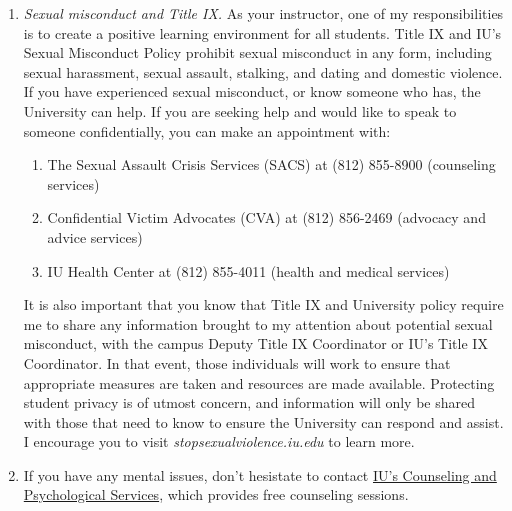 \documentclass[11pt,article,oneside]{memoir} %
\begin{document}
\begin{enumerate}
\item \emph{Sexual misconduct and Title IX.} As your instructor, one of my
responsibilities is to create a positive learning environment for all students.
Title IX and IU's Sexual Misconduct Policy prohibit sexual misconduct in any
form, including sexual harassment, sexual assault, stalking, and dating and
domestic violence.  If you have experienced sexual misconduct, or know someone
who has, the University can help. If you are seeking help and would like to
speak to someone confidentially, you can make an appointment with:

\begin{enumerate}
    
\item The Sexual Assault Crisis Services (SACS) at (812) 855-8900 (counseling services)
\item Confidential Victim Advocates (CVA) at (812) 856-2469 (advocacy and advice services)
\item IU Health Center at (812) 855-4011 (health and medical services)

\end{enumerate}

It is also important that you know that Title IX and University policy require me to share any information brought to my attention about potential sexual misconduct, with the campus Deputy Title IX Coordinator or IU's Title IX Coordinator. 
In that event, those individuals will work to ensure that appropriate measures are taken and resources are made available. 
Protecting student privacy is of utmost concern, and information will only be shared with those that need to know to ensure the University can respond and assist. 
I encourage you to visit \emph{stopsexualviolence.iu.edu} to learn more. 




\item If you have any mental issues, don't hesistate to contact \href{http://healthcenter.indiana.edu/counseling/index.shtml}{IU's Counseling and Psychological Services}, which provides free counseling sessions. 


\end{enumerate}%
\end{document}

